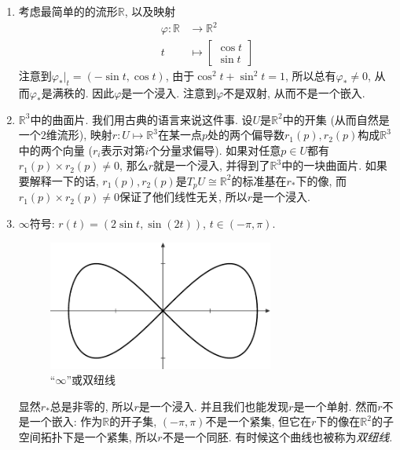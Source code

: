\begin{eg}\label{submanifold_eg}
    \begin{enumerate}[(1)]
        \item 考虑最简单的的流形$\mathbb{R}$, 以及映射
        \begin{align*}
            \varphi:\mathbb{R}&\to\mathbb{R}^2\\
            t&\mapsto\begin{bmatrix}
                \cos{t}\\ \sin{t}
            \end{bmatrix}
        \end{align*}
        注意到$\varphi_*|_t=(-\sin{t},\cos{t})$, 由于$\cos^2t+\sin^2t=1$, 所以总有$\varphi_*\neq 0$, 从而$\varphi_*$是满秩的.
        因此$\varphi$是一个浸入.
        注意到$\varphi$不是双射, 从而不是一个嵌入.
        \item $\mathbb{R}^3$中的曲面片.
        我们用古典的语言来说这件事.
        设$U$是$\mathbb{R}^2$中的开集 (从而自然是一个$2$维流形), 映射$r:U\mapsto\mathbb{R}^3$在某一点$p$处的两个偏导数$r_1(p),r_2(p)$构成$\mathbb{R}^3$中的两个向量 ($r_i$表示对第$i$个分量求偏导).
        如果对任意$p\in U$都有$r_1(p)\times r_2(p)\neq 0$, 那么$r$就是一个浸入, 并得到了$\mathbb{R}^3$中的一块曲面片.
        如果要解释一下的话, $r_1(p),r_2(p)$是$T_pU\cong\mathbb{R}^2$的标准基在$r_*$下的像, 而$r_1(p)\times r_2(p)\neq 0$保证了他们线性无关, 所以$r$是一个浸入.
        \item $\infty$符号: $r(t)=(2\sin{t},\sin(2t))$, $t\in(-\pi,\pi)$.
        \begin{figure}[ht]
            \centering
            \includegraphics[width=0.7\textwidth]{figures/lemniscate.pdf}
            \caption{``$\infty$''或双纽线}
        \end{figure}
        显然$r_*$总是非零的, 所以$r$是一个浸入.
        并且我们也能发现$r$是一个单射.
        然而$r$不是一个嵌入: 作为$\mathbb{R}$的开子集, $(-\pi,\pi)$不是一个紧集, 但它在$r$下的像在$\mathbb{R}^2$的子空间拓扑下是一个紧集, 所以$r$不是一个同胚.
        有时候这个曲线也被称为\textit{双纽线}.
    \end{enumerate}
\end{eg}

